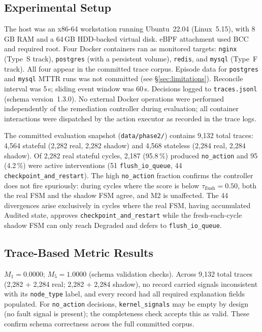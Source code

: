 \documentclass[conference]{IEEEtran}
\begin{document}
\subsection{Experimental Setup}

The host was an x86-64 workstation running Ubuntu~22.04 (Linux~5.15), with 8\,GB RAM and a 64\,GB HDD-backed virtual disk. eBPF attachment used BCC and required root. Four Docker containers ran as monitored targets: \texttt{nginx} (Type~S track), \texttt{postgres} (with a persistent volume), \texttt{redis}, and \texttt{mysql} (Type~F track). All four appear in the committed trace corpus. Episode data for \texttt{postgres} and \texttt{mysql} MTTR runs was not committed (see §\ref{sec:limitations}). Reconcile interval was 5\,s; sliding event window was 60\,s. Decisions logged to \texttt{traces.jsonl} (schema version~1.3.0). No external Docker operations were performed independently of the remediation controller during evaluation; all container interactions were dispatched by the action executor as recorded in the trace logs.

The committed evaluation snapshot (\texttt{data/phase2/}) contains 9,132 total traces: 4,564 stateful (2,282 real, 2,282 shadow) and 4,568 stateless (2,284 real, 2,284 shadow). Of 2,282 real stateful cycles, 2,187 (95.8\,\%) produced \texttt{no\_action} and 95 (4.2\,\%) were active interventions (51 \texttt{flush\_io\_queue}, 44 \texttt{checkpoint\_and\_restart}). The high \texttt{no\_action} fraction confirms the controller does not fire spuriously: during cycles where the score is below $\tau_{\mathrm{flush}} = 0.50$, both the real FSM and the shadow FSM agree, and M2 is unaffected. The 44 divergences arise exclusively in cycles where the real FSM, having accumulated Audited state, approves \texttt{checkpoint\_and\_restart} while the fresh-each-cycle shadow FSM can only reach Degraded and defers to \texttt{flush\_io\_queue}.

\subsection{Trace-Based Metric Results}

$M_1 = 0.0000$; $M_5 = 1.0000$ (schema validation checks). Across 9,132 total traces (2,282 + 2,284 real; 2,282 + 2,284 shadow), no record carried signals inconsistent with its \texttt{node\_type} label, and every record had all required explanation fields populated. For \texttt{no\_action} decisions, \texttt{kernel\_signals} may be empty by design (no fault signal is present); the completeness check accepts this as valid. These confirm schema correctness across the full committed corpus.
\end{document}
